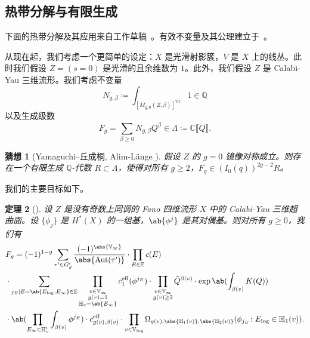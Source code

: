 \documentclass{amsart}
\newtheorem{thm}{定理}[section]
\newtheorem{conj}[thm]{猜想}
\theoremstyle{definition}
\theoremstyle{remark}
\theoremstyle{plain}
\theoremstyle{definition}
\theoremstyle{remark}
\newcommand{\C}{\mathbb{C}}
\newcommand{\Q}{\mathbb{Q}}
\newcommand{\E}{\mathbb{E}}
\newcommand{\V}{\mathbb{V}}
\renewcommand{\H}{\mathbb{H}}
\newcommand{\mr}[1]{\mathrm{#1}}
\newcommand{\on}[1]{\operatorname{#1}}
\newcommand{\1}{\mathbf{1}}
\newcommand{\2}{\mathbf{2}}
\newcommand{\3}{\mathbf{3}}
\newcommand{\vir}{\mr{vir}}
\newcommand{\ps}[1]{\llbracket #1 \rrbracket}
\DeclareMathOperator{\Aut}{Aut}
\begin{document}
\subsection{热带分解与有限生成}%
\label{sub:Tropical decomposition and finite generation}

下面的热带分解及其应用来自工作草稿~\cite{CJRtropical2025}。有效不变量及其公理建立于~\cite{CJRpunctured}。

从现在起，我们考虑一个更简单的设定：\(X\) 是光滑射影簇，\(V\) 是 \(X\) 上的线丛。此时我们假设 \(Z = (s = 0)\) 是光滑的且余维数为 \(1\)。此外，我们假设 \(Z\) 是 Calabi-Yau 三维流形。我们考虑不变量
\[ N_{g, \beta} \coloneqq \int_{[\bar{M}_{g,0}(Z, \beta)]^{\vir}} 1 \in \Q \]
以及生成级数
\[ F_g = \sum_{\beta \geq 0} N_{g, \beta} Q^{\beta} \in \Lambda \coloneqq \C \ps{Q}. \]

\begin{conj}[Yamaguchi–丘成桐, Alim-L\"ange {\cite{YY2004,AlimLange2007}}]
    假设 \(Z\) 的 \(g=0\) 镜像对称成立。则存在一个有限生成 \(\Q\)-代数 \(R \subset \Lambda\)，使得对所有 \(g \geq 2\)，\(F_g \in (I_0(q))^{2g-2} R\)。
\end{conj}

我们的主要目标如下。

\begin{thm}[{\cite{CJRtropical2025}}]
    设 \(Z\) 是没有奇数上同调的 Fano 四维流形 \(X\) 中的 Calabi-Yau 三维超曲面。设 \(\{\phi_j\}\) 是 \(H^*(X)\) 的一组基，\(\ab\{\phi^j\}\) 是其对偶基。则对所有 \(g \geq 0\)，我们有
    \begin{align*}
        &F_g = (-1)^{1-g} \sum_{\tau' \in G_g'} \frac{(-1)^{\abs{\V_{\infty}}}}{\abs{\Aut(\tau')}} \cdot \prod_{E \in \E} c(E) \\
        & \cdot \sum_{j_E \mid E = \ab\{E_{\log}, E_{\infty}\} \in \E} \prod_{\substack{v \in \V_{\infty} \\ g(v)=1 \\ \H_v = \ab\{E_{\infty}\}}} c_1^{\mr{eff}}(\phi^{j_E}) \cdot \prod_{\substack{v \in \V_{\infty} \\ g(v) \geq 2}} \tilde{Q}^{\beta(v)} \cdot \exp \ab(\int_{\beta(v)} K(Q) )  \\
        & \cdot \ab(\prod_{E_{\infty} \in \H_v'}\int_{\beta(v)} \phi^{j_E}) \cdot c_{g(v), \beta(v)}^{\on{eff}} 
         \cdot \prod_{v \in \V_{\log}} \Omega_{g(v), \abs{\H_1(v)}, \abs{\H_2(v)}} (\phi_{j_E} \colon E_{\log} \in \H_1(v)).
    \end{align*}
\end{thm}
\end{document}
